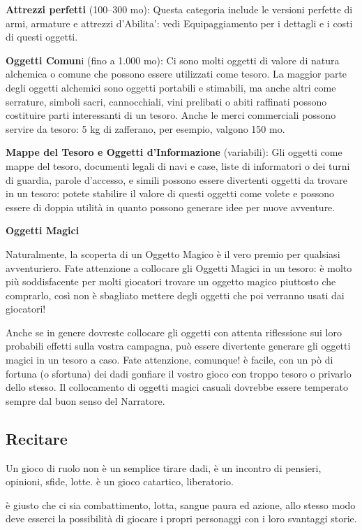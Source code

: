 \documentclass[a4paper,11pt,twoside,openany]{book}
\begin{document}
{\textbf{Attrezzi perfetti} (100--300 mo): Questa categoria include le versioni perfette di armi, armature e attrezzi d'Abilita': vedi Equipaggiamento per i dettagli e i costi di questi oggetti.

\textbf{Oggetti Comun}i (fino a 1.000 mo): Ci sono molti oggetti di valore di natura alchemica o comune che possono essere utilizzati come tesoro. La maggior parte degli oggetti alchemici sono oggetti portabili e stimabili, ma anche altri come serrature, simboli sacri, cannocchiali, vini prelibati o abiti raffinati possono costituire parti interessanti di un tesoro. Anche le merci commerciali possono servire da tesoro: 5 kg di zafferano, per esempio, valgono 150 mo.

\textbf{Mappe del Tesoro e Oggetti d'Informazione} (variabili): Gli oggetti come mappe del tesoro, documenti legali di navi e case, liste di informatori o dei turni di guardia, parole d'accesso, e simili possono essere divertenti oggetti da trovare in un tesoro: potete stabilire il valore di questi oggetti come volete e possono essere di doppia utilità in quanto possono generare idee per nuove avventure.

\textbf{Oggetti Magici}

Naturalmente, la scoperta di un Oggetto Magico è il vero premio per qualsiasi avventuriero. Fate attenzione a collocare gli Oggetti Magici in un tesoro: è molto più soddisfacente per molti giocatori trovare un oggetto magico piuttosto che comprarlo, così non è sbagliato mettere degli oggetti che poi verranno usati dai giocatori!

Anche se in genere dovreste collocare gli oggetti con attenta riflessione sui loro probabili effetti sulla vostra campagna, può essere divertente generare gli oggetti magici in un tesoro a caso. Fate attenzione, comunque! è facile, con un pò di fortuna (o sfortuna) dei dadi gonfiare il vostro gioco con troppo tesoro o privarlo dello stesso. Il collocamento di oggetti magici casuali dovrebbe essere temperato sempre dal buon senso del Narratore.

\subsection{Recitare}

\label{recitare}

Un gioco di ruolo non è un semplice tirare dadi, è un incontro di pensieri, opinioni, sfide, lotte. è un gioco catartico, liberatorio.

è giusto che ci sia combattimento, lotta, sangue paura ed azione, allo stesso modo deve esserci la possibilità di giocare i propri personaggi con i loro svantaggi storie.

}
\end{document}
